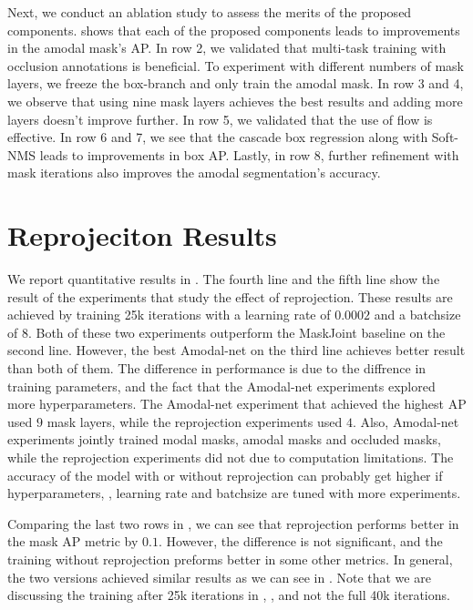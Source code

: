 Next, we conduct an ablation study to assess the merits of the proposed components.   shows that each of the proposed components leads to improvements in the amodal mask's AP.
In row 2, we validated that multi-task training with occlusion annotations is beneficial. 
To experiment with different numbers of mask layers, we freeze the box-branch and only train the amodal mask.
In row 3 and 4, we observe that using nine mask layers achieves the best results and adding more layers doesn't improve further. In row 5, we validated that the use of flow is effective. 
In row 6 and 7, we see that the cascade box regression along with Soft-NMS leads to improvements in box AP. Lastly, in row 8, further refinement with mask iterations also improves the amodal segmentation's accuracy.




\section{Reprojeciton Results}
We report quantitative results in . The fourth line and the fifth line show the result of the experiments that study the effect of reprojection. These results are achieved by training 25k iterations with a learning rate of $0.0002$ and a batchsize of $8$. Both of these two experiments outperform the MaskJoint baseline on the second line. However, the best Amodal-net on the third line achieves better result than both of them. The difference in performance is due to the diffrence in training parameters, and the fact that the Amodal-net experiments explored more hyperparameters. The Amodal-net experiment that achieved the highest AP used $9$ mask layers, while the reprojection experiments used $4$. Also, Amodal-net experiments jointly trained modal masks, amodal masks and occluded masks, while the reprojection experiments did not due to computation limitations. The accuracy of the model with or without reprojection can probably get higher if hyperparameters, \eg, learning rate and batchsize are tuned with more experiments. 

 

Comparing the last two rows in , we can see that reprojection performs better in the mask AP metric by $0.1$. However, the difference is not significant, and the training without reprojection preforms better in some other metrics. In general, the two versions achieved similar results as we can see in . Note that we are discussing the training after 25k iterations in , ,  and  not the full 40k iterations. 

